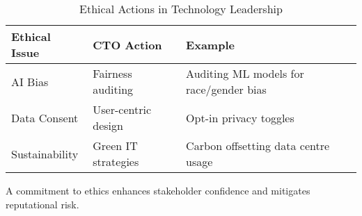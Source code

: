 \begin{table}[h!]
    \centering
    \begin{tabular}{|l|l|l|}
        \hline
        \textbf{Ethical Issue} & \textbf{CTO Action} & \textbf{Example}                        \\
        \hline
        AI Bias                & Fairness auditing   & Auditing ML models for race/gender bias \\
        Data Consent           & User-centric design & Opt-in privacy toggles                  \\
        Sustainability         & Green IT strategies & Carbon offsetting data centre usage     \\
        \hline
    \end{tabular}
    \caption{Ethical Actions in Technology Leadership}
    \label{tab:ethics}
\end{table}

A commitment to ethics enhances stakeholder confidence and mitigates reputational risk.
